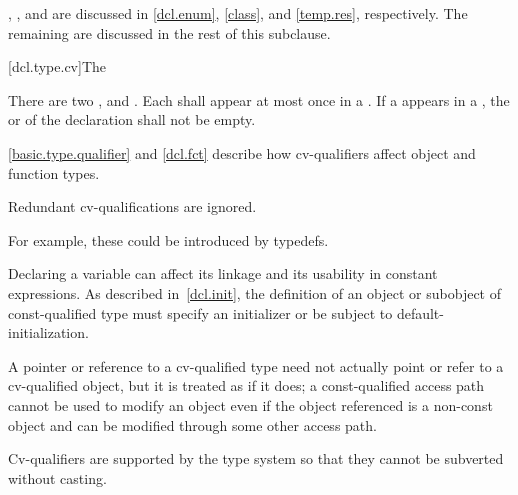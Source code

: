 \pnum
\begin{note}
,
,
and
are discussed
in
\ref{dcl.enum},
\ref{class},
and
\ref{temp.res}, respectively. The remaining
 are discussed in the rest of this subclause.
\end{note}

[dcl.type.cv]{The }%
%
%
%

\pnum
There are two ,  and
. Each  shall appear at most once in
a . If a  appears in a
, the 
or  of
the declaration shall not be empty.
\begin{note}
\ref{basic.type.qualifier} and \ref{dcl.fct} describe how cv-qualifiers affect object and
function types.
\end{note}
Redundant cv-qualifications are ignored.
\begin{note}
For example,
these could be introduced by typedefs.
\end{note}

\pnum
\begin{note}
Declaring a variable  can affect its linkage
and its usability in constant expressions. As
described in~\ref{dcl.init}, the definition of an object or subobject
of const-qualified type must specify an initializer or be subject to
default-initialization.
\end{note}

\pnum
A pointer or reference to a cv-qualified type need not actually point or
refer to a cv-qualified object, but it is treated as if it does; a
const-qualified access path cannot be used to modify an object even if
the object referenced is a non-const object and can be modified through
some other access path.
\begin{note}
Cv-qualifiers are supported by the type system so that they cannot be
subverted without casting.
\end{note}

